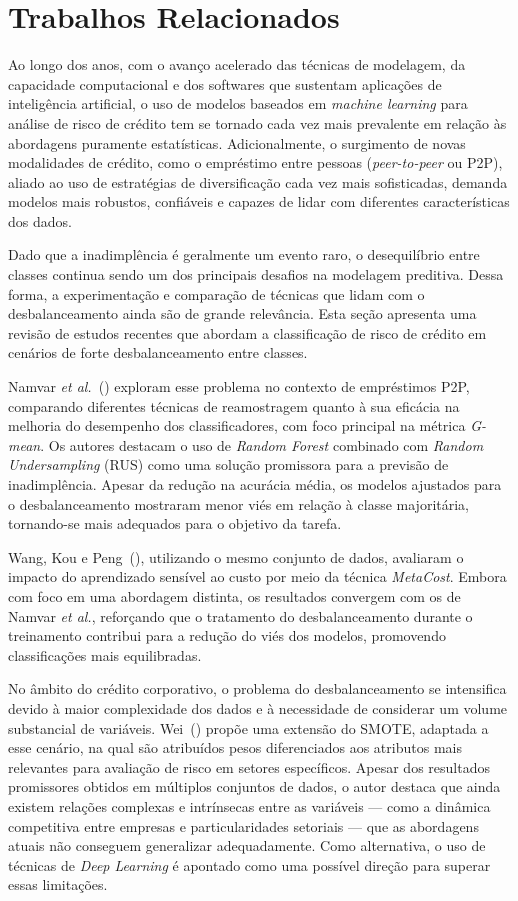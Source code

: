 \section{Trabalhos Relacionados}

Ao longo dos anos, com o avanço acelerado das técnicas de modelagem, da capacidade computacional e dos softwares que sustentam aplicações de inteligência artificial, o uso de modelos baseados em \textit{machine learning} para análise de risco de crédito tem se tornado cada vez mais prevalente em relação às abordagens puramente estatísticas. Adicionalmente, o surgimento de novas modalidades de crédito, como o empréstimo entre pessoas (\textit{peer-to-peer} ou P2P), aliado ao uso de estratégias de diversificação cada vez mais sofisticadas, demanda modelos mais robustos, confiáveis e capazes de lidar com diferentes características dos dados.

Dado que a inadimplência é geralmente um evento raro, o desequilíbrio entre classes continua sendo um dos principais desafios na modelagem preditiva. Dessa forma, a experimentação e comparação de técnicas que lidam com o desbalanceamento ainda são de grande relevância. Esta seção apresenta uma revisão de estudos recentes que abordam a classificação de risco de crédito em cenários de forte desbalanceamento entre classes.

Namvar \textit{et al.}~(\citeyear{Namvar2018}) exploram esse problema no contexto de empréstimos P2P, comparando diferentes técnicas de reamostragem quanto à sua eficácia na melhoria do desempenho dos classificadores, com foco principal na métrica \textit{G-mean}. Os autores destacam o uso de \textit{Random Forest} combinado com \textit{Random Undersampling} (RUS) como uma solução promissora para a previsão de inadimplência. Apesar da redução na acurácia média, os modelos ajustados para o desbalanceamento mostraram menor viés em relação à classe majoritária, tornando-se mais adequados para o objetivo da tarefa.

Wang, Kou e Peng~(\citeyear{Namvar2018}), utilizando o mesmo conjunto de dados, avaliaram o impacto do aprendizado sensível ao custo por meio da técnica \textit{MetaCost}. Embora com foco em uma abordagem distinta, os resultados convergem com os de Namvar \textit{et al.}, reforçando que o tratamento do desbalanceamento durante o treinamento contribui para a redução do viés dos modelos, promovendo classificações mais equilibradas.

No âmbito do crédito corporativo, o problema do desbalanceamento se intensifica devido à maior complexidade dos dados e à necessidade de considerar um volume substancial de variáveis. Wei~(\citeyear{Wei2025}) propõe uma extensão do SMOTE, adaptada a esse cenário, na qual são atribuídos pesos diferenciados aos atributos mais relevantes para avaliação de risco em setores específicos. Apesar dos resultados promissores obtidos em múltiplos conjuntos de dados, o autor destaca que ainda existem relações complexas e intrínsecas entre as variáveis — como a dinâmica competitiva entre empresas e particularidades setoriais — que as abordagens atuais não conseguem generalizar adequadamente. Como alternativa, o uso de técnicas de \textit{Deep Learning} é apontado como uma possível direção para superar essas limitações.


